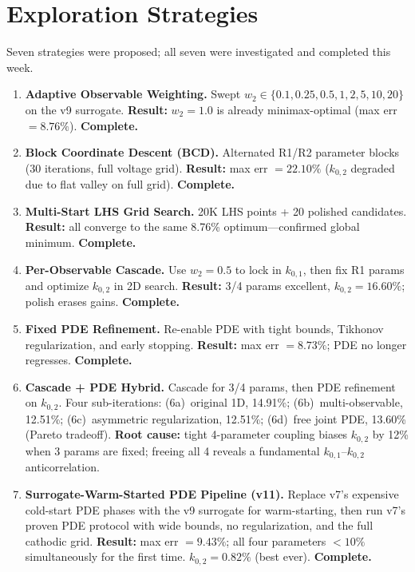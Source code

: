 \documentclass[11pt]{article}
\begin{document}
\section{Exploration Strategies}

Seven strategies were proposed; all seven were investigated and completed this week.

\begin{enumerate}
  \item \textbf{Adaptive Observable Weighting.}  Swept $w_2 \in \{0.1, 0.25,
        0.5, 1, 2, 5, 10, 20\}$ on the v9 surrogate.
        \textbf{Result:} $w_2 = 1.0$ is already minimax-optimal (max err $= 8.76\%$).
        \textbf{Complete.}

  \item \textbf{Block Coordinate Descent (BCD).}  Alternated R1/R2 parameter
        blocks (30 iterations, full voltage grid).
        \textbf{Result:} max err $= 22.10\%$ ($k_{0,2}$ degraded due to flat valley
        on full grid).  \textbf{Complete.}

  \item \textbf{Multi-Start LHS Grid Search.}  20K LHS points + 20 polished
        candidates.
        \textbf{Result:} all converge to the same 8.76\% optimum---confirmed global minimum.
        \textbf{Complete.}

  \item \textbf{Per-Observable Cascade.}  Use $w_2 = 0.5$ to lock in
        $k_{0,1}$, then fix R1 params and optimize $k_{0,2}$ in 2D search.
        \textbf{Result:} 3/4 params excellent, $k_{0,2} = 16.60\%$; polish erases gains.
        \textbf{Complete.}

  \item \textbf{Fixed PDE Refinement.}  Re-enable PDE with tight bounds,
        Tikhonov regularization, and early stopping.
        \textbf{Result:} max err $= 8.73\%$; PDE no longer regresses.
        \textbf{Complete.}

  \item \textbf{Cascade + PDE Hybrid.}  Cascade for 3/4 params, then PDE
        refinement on $k_{0,2}$.  Four sub-iterations:
        (6a)~original 1D, 14.91\%;
        (6b)~multi-observable, 12.51\%;
        (6c)~asymmetric regularization, 12.51\%;
        (6d)~free joint PDE, 13.60\% (Pareto tradeoff).
        \textbf{Root cause:} tight 4-parameter coupling biases $k_{0,2}$ by 12\%
        when 3 params are fixed; freeing all 4 reveals a fundamental
        $k_{0,1}$--$k_{0,2}$ anticorrelation.

  \item \textbf{Surrogate-Warm-Started PDE Pipeline (v11).}  Replace v7's
        expensive cold-start PDE phases with the v9 surrogate for warm-starting,
        then run v7's proven PDE protocol with wide bounds, no regularization,
        and the full cathodic grid.
        \textbf{Result:} max err $= 9.43\%$; all four parameters $< 10\%$
        simultaneously for the first time.  $k_{0,2} = 0.82\%$ (best ever).
        \textbf{Complete.}
\end{enumerate}
\end{document}
